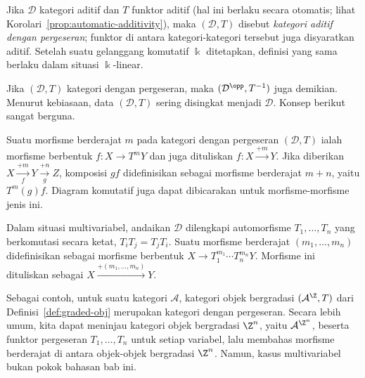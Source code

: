 \begin{definisi}
	Jika $\mathcal{D}$ kategori aditif dan $T$ funktor aditif (hal ini
	berlaku secara otomatis; lihat Korolari~\ref{prop:automatic-additivity}),
	maka $(\mathcal{D},T)$ disebut \emph{kategori aditif dengan pergeseran};
	funktor di antara kategori-kategori tersebut juga disyaratkan aditif.
	Setelah suatu gelanggang komutatif $\Bbbk$ ditetapkan, definisi yang sama
	berlaku dalam situasi $\Bbbk$-linear.
\end{definisi}

Jika $(\mathcal{D},T)$ kategori dengan pergeseran, maka
$(\mathcal{D}^{\opp},T^{-1})$ juga demikian. Menurut kebiasaan, data
$(\mathcal{D},T)$ sering disingkat menjadi $\mathcal{D}$. Konsep berikut
sangat berguna.

\begin{definisi}\label{def:morphism-with-degree}
	Suatu morfisme berderajat $m$ pada kategori dengan pergeseran
	$(\mathcal{D},T)$ ialah morfisme berbentuk $f:X\to T^mY$ dan juga
	dituliskan $f:X\xrightarrow{+m}Y$. Jika diberikan
	$X\xrightarrow[f]{+m}Y\xrightarrow[g]{+n}Z$, komposisi $gf$
	didefinisikan sebagai morfisme berderajat $m+n$, yaitu $T^m(g)f$.
	Diagram komutatif juga dapat dibicarakan untuk morfisme-morfisme jenis ini.

	Dalam situasi multivariabel, andaikan $\mathcal{D}$ dilengkapi
	automorfisme $T_1,\ldots,T_n$ yang berkomutasi secara ketat,
	$T_iT_j=T_jT_i$. Suatu morfisme berderajat $(m_1,\ldots,m_n)$
	didefinisikan sebagai morfisme berbentuk
	$X\to T_1^{m_1}\cdots T_n^{m_n}Y$. Morfisme ini dituliskan sebagai
	$X\xrightarrow{+(m_1,\ldots,m_n)}Y$.
\end{definisi}

Sebagai contoh, untuk suatu kategori $\mathcal{A}$, kategori objek bergradasi
$(\mathcal{A}^{\Z},T)$ dari Definisi~\ref{def:graded-obj} merupakan kategori
dengan pergeseran. Secara lebih umum, kita dapat meninjau kategori objek
bergradasi $\Z^n$, yaitu $\mathcal{A}^{\Z^n}$, beserta funktor pergeseran
$T_1,\ldots,T_n$ untuk setiap variabel, lalu membahas morfisme berderajat di
antara objek-objek bergradasi $\Z^n$. Namun, kasus multivariabel bukan pokok
bahasan bab ini.

